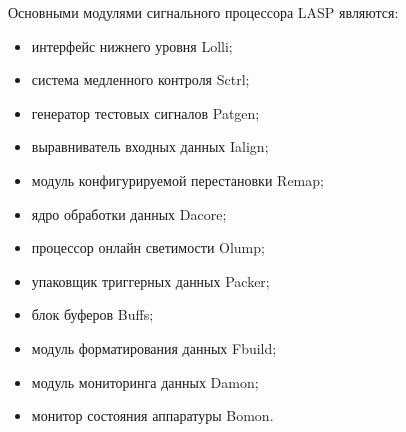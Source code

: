 Основными модулями сигнального процессора LASP являются:\par
\begin{itemize}
    \item интерфейс нижнего уровня Lolli;
    \item система медленного контроля Sctrl;
    \item генератор тестовых сигналов Patgen;
    \item выравниватель входных данных Ialign;
    \item модуль конфигурируемой перестановки Remap;
    \item ядро обработки данных Dacore;
    \item процессор онлайн светимости Olump;
    \item упаковщик триггерных данных Packer;
    \item блок буферов Buffs;
    \item модуль форматирования данных Fbuild;
    \item модуль мониторинга данных Damon;
    \item монитор состояния аппаратуры Bomon.
\end{itemize}\par

